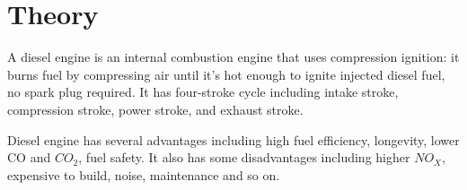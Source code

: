 \section{Theory}

A diesel engine is an internal combustion engine that uses compression ignition: it burns fuel by compressing air until it's hot enough to ignite injected diesel fuel, no spark plug required. It has four-stroke cycle including intake stroke, compression stroke, power stroke, and exhaust stroke.

Diesel engine has several advantages including high fuel efficiency, longevity, lower CO and $CO_2$, fuel safety. It also has some disadvantages including higher $NO_X$, expensive to build, noise, maintenance and so on.
